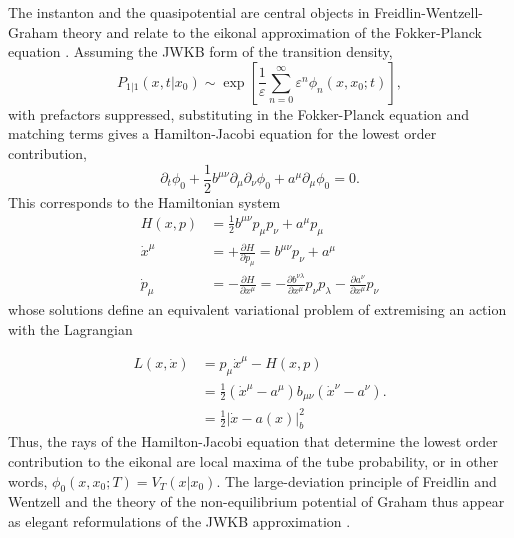 The instanton and the quasipotential are central objects in Freidlin-Wentzell-Graham
theory and relate to the eikonal approximation of the Fokker-Planck
equation \citep{ludwig1975persistence}. Assuming the JWKB form of
the transition density,
\[
P_{1|1}(x,t|x_{0})\sim\exp\left[\frac{1}{\varepsilon}\sum_{n=0}^{\infty}\varepsilon^{n}\phi_{n}(x,x_{0};t)\right],
\]
with prefactors suppressed, substituting in the Fokker-Planck equation
and matching terms gives a Hamilton-Jacobi equation for the lowest
order contribution,
\begin{equation}
\partial_{t}\phi_{0}+\frac{1}{2}b^{\mu\nu}\partial_{\mu}\partial_{\nu}\phi_{0}+a^{\mu}\partial_{\mu}\phi_{0}=0.
\end{equation}
This corresponds to the Hamiltonian system
\begin{align}
H(x,p) & =\frac{1}{2}b^{\mu\nu}p_{\mu}p_{\nu}+a^{\mu}p_{\mu}\\
\dot{x}^{\mu} & =+\frac{\partial H}{\partial p_{\mu}}=b^{\mu\nu}p_{\nu}+a^{\mu}\nonumber \\
\dot{p}_{\mu} & =-\frac{\partial H}{\partial x^{\mu}}=-\frac{\partial b^{\nu\lambda}}{\partial x^{\mu}}p_{\nu}p_{\lambda}-\frac{\partial a^{\nu}}{\partial x^{\mu}}p_{\nu}\nonumber 
\end{align}
whose solutions define an equivalent variational problem of extremising
an action with the Lagrangian

\begin{align}
L(x,\dot{x}) & =p_{\mu}\dot{x}^{\mu}-H(x,p)\label{eq:Legendre-form-of-Lagrangian}\\
 & =\frac{1}{2}(\dot{x}^{\mu}-a^{\mu})b_{\mu\nu}(\dot{x}^{\nu}-a^{\nu}).\nonumber \\
 & =\frac{1}{2}|\dot{x}-a(x)|_{b}^{2}\nonumber 
\end{align}
Thus, the rays of the Hamilton-Jacobi equation that determine the
lowest order contribution to the eikonal are local maxima of the tube
probability, or in other words, $\phi_{0}(x,x_{0};T)=V_{T}(x|x_{0})$.
The large-deviation principle of Freidlin and Wentzell and the theory
of the non-equilibrium potential of Graham \citep{graham1973statistical,graham1987macroscopic}
thus appear as elegant reformulations of the JWKB approximation \citep{ludwig1975persistence}. 

